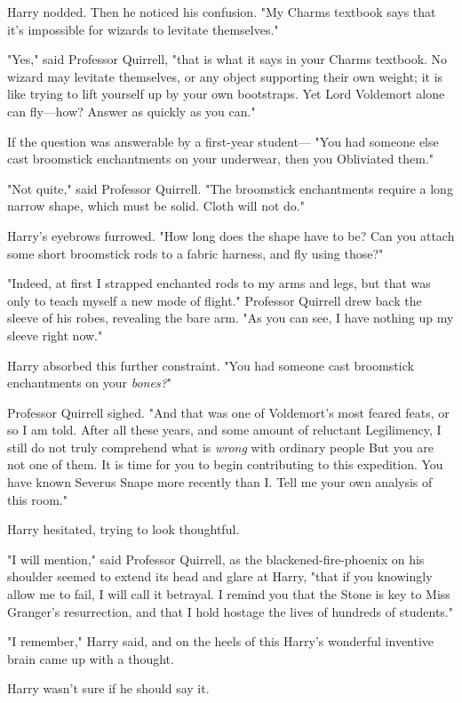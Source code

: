 Harry nodded. Then he noticed his confusion. "My Charms textbook says that it's
impossible for wizards to levitate themselves."

"Yes," said Professor Quirrell, "that is what it says in your Charms textbook.
No wizard may levitate themselves, or any object supporting their own weight;
it is like trying to lift yourself up by your own bootstraps. Yet Lord
Voldemort alone can fly---how? Answer as quickly as you can."

If the question was answerable by a first-year student--- "You had someone else
cast broomstick enchantments on your underwear, then you Obliviated them."

"Not quite," said Professor Quirrell. "The broomstick enchantments require a
long narrow shape, which must be solid. Cloth will not do."

Harry's eyebrows furrowed. "How long does the shape have to be? Can you attach
some short broomstick rods to a fabric harness, and fly using those?"

"Indeed, at first I strapped enchanted rods to my arms and legs, but that was
only to teach myself a new mode of flight." Professor Quirrell drew back the
sleeve of his robes, revealing the bare arm. "As you can see, I have nothing up
my sleeve right now."

Harry absorbed this further constraint. "You had someone cast broomstick
enchantments on your \emph{bones?}"

Professor Quirrell sighed. "And that was one of Voldemort's most feared feats,
or so I am told. After all these years, and some amount of reluctant
Legilimency, I still do not truly comprehend what is \emph{wrong} with ordinary
people{\el} But you are not one of them. It is time for you to begin
contributing to this expedition. You have known Severus Snape more recently
than I. Tell me your own analysis of this room."

Harry hesitated, trying to look thoughtful.

"I will mention," said Professor Quirrell, as the blackened-fire-phoenix on his
shoulder seemed to extend its head and glare at Harry, "that if you knowingly
allow me to fail, I will call it betrayal. I remind you that the Stone is key
to Miss Granger's resurrection, and that I hold hostage the lives of hundreds
of students."

"I remember," Harry said, and on the heels of this Harry's wonderful inventive
brain came up with a thought.

Harry wasn't sure if he should say it.

